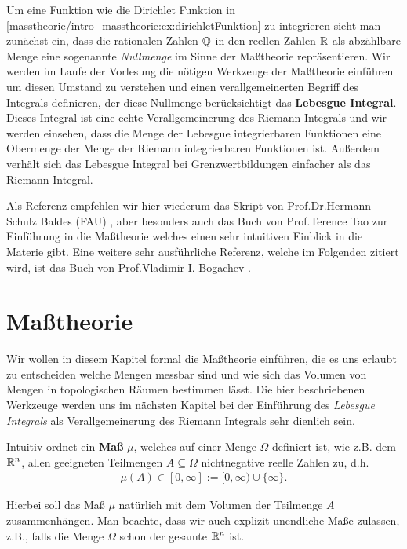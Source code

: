 \par
Um eine Funktion wie die Dirichlet Funktion in \cref{masstheorie/intro_masstheorie:ex:dirichletFunktion} zu integrieren sieht man zunächst ein, dass die rationalen Zahlen \(\mathbb{Q}\) in den reellen Zahlen \(\mathbb{R}\) als abzählbare Menge eine sogenannte \emph{Nullmenge} im Sinne der Maßtheorie repräsentieren.
Wir werden im Laufe der Vorlesung die nötigen Werkzeuge der Maßtheorie einführen um diesen Umstand zu verstehen und einen verallgemeinerten Begriff des Integrals definieren, der diese Nullmenge berücksichtigt   das \textbf{Lebesgue Integral}.
Dieses Integral ist eine echte Verallgemeinerung des Riemann Integrals und wir werden einsehen, dass die Menge der Lebesgue integrierbaren Funktionen eine Obermenge der Menge der Riemann integrierbaren Funktionen ist.
Außerdem verhält sich das Lebesgue Integral bei Grenzwertbildungen einfacher als das Riemann Integral.

\par
Als Referenz empfehlen wir hier wiederum das Skript von Prof.Dr.Hermann Schulz Baldes (FAU) \cite{SB18}, aber besonders auch das Buch von Prof.Terence Tao zur Einführung in die Maßtheorie \cite{Tao07} welches einen sehr intuitiven Einblick in die Materie gibt. Eine weitere sehr ausführliche Referenz, welche im Folgenden zitiert wird, ist das Buch von Prof.Vladimir I. Bogachev \cite{Bog07}.


\section{Maßtheorie}
\label{\detokenize{masstheorie/masstheorie:masztheorie}}\label{\detokenize{masstheorie/masstheorie::doc}}
\par
Wir wollen in diesem Kapitel formal die Maßtheorie einführen, die es uns erlaubt zu entscheiden welche Mengen messbar sind und wie sich das Volumen von Mengen in topologischen Räumen bestimmen lässt.
Die hier beschriebenen Werkzeuge werden uns im nächsten Kapitel bei der Einführung des \emph{Lebesgue Integrals} als Verallgemeinerung des Riemann Integrals sehr dienlich sein.

\par
Intuitiv ordnet ein \href{https://de.wikipedia.org/wiki/Ma\%c3\%9f\_(Mathematik)}{\textbf{Maß}} \(\mu\), welches auf einer Menge \(\Omega\) definiert ist, wie z.B. dem \(\mathbb{R}^n\), allen geeigneten Teilmengen \(A\subseteq \Omega\) nichtnegative reelle Zahlen zu, d.h.
\begin{align*}
\mu(A)\in[0,\infty] := [0,\infty)\cup\{\infty\}.
\end{align*}
\par
Hierbei soll das Maß \(\mu\) natürlich mit dem Volumen der Teilmenge \(A\) zusammenhängen.
Man beachte, dass wir auch explizit unendliche Maße zulassen, z.B., falls die Menge \(\Omega\) schon der gesamte \(\mathbb{R}^n\) ist.

